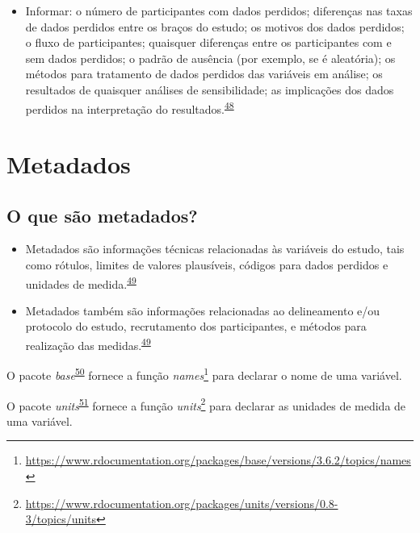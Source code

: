 \documentclass[
  a4paper,
]{book}
\providecommand{\tightlist}{%
  \setlength{\itemsep}{0pt}\setlength{\parskip}{0pt}}
\renewcommand{\href}[2]{#2\footnote{\url{#1}}}
\newenvironment{infobox}[1]
  {
  \begin{itemize}
  \renewcommand{\labelitemi}{
    \raisebox{-.7\height}[0pt][0pt]{
      {\setkeys{Gin}{width=3em,keepaspectratio}
        \texttt{[image: \#1]}}
    }
  }
  \setlength{\fboxsep}{1em}
  \begin{blackbox}
  \item
  }
  {
  \end{blackbox}
  \end{itemize}
  }
\begin{document}
\begin{itemize}
\tightlist
\item
  Informar: o número de participantes com dados perdidos; diferenças nas taxas de dados perdidos entre os braços do estudo; os motivos dos dados perdidos; o fluxo de participantes; quaisquer diferenças entre os participantes com e sem dados perdidos; o padrão de ausência (por exemplo, se é aleatória); os métodos para tratamento de dados perdidos das variáveis em análise; os resultados de quaisquer análises de sensibilidade; as implicações dos dados perdidos na interpretação do resultados.\textsuperscript{\protect\hyperlink{ref-Akl2015}{48}}
\end{itemize}

\hypertarget{metadados}{%
\section{Metadados}\label{metadados}}

\hypertarget{o-que-suxe3o-metadados}{%
\subsection{O que são metadados?}\label{o-que-suxe3o-metadados}}

\begin{itemize}
\item
  Metadados são informações técnicas relacionadas às variáveis do estudo, tais como rótulos, limites de valores plausíveis, códigos para dados perdidos e unidades de medida.\textsuperscript{\protect\hyperlink{ref-Baillie2022}{49}}
\item
  Metadados também são informações relacionadas ao delineamento e/ou protocolo do estudo, recrutamento dos participantes, e métodos para realização das medidas.\textsuperscript{\protect\hyperlink{ref-Baillie2022}{49}}
\end{itemize}

\begin{infobox}{images/Rlogo}
O pacote \emph{base}\textsuperscript{\protect\hyperlink{ref-base-3}{50}} fornece a função \href{https://www.rdocumentation.org/packages/base/versions/3.6.2/topics/names}{\emph{names}} para declarar o nome de uma variável.

\end{infobox}

\begin{infobox}{images/Rlogo}
O pacote \emph{units}\textsuperscript{\protect\hyperlink{ref-units}{51}} fornece a função \href{https://www.rdocumentation.org/packages/units/versions/0.8-3/topics/units}{\emph{units}} para declarar as unidades de medida de uma variável.

\end{infobox}
\end{document}
